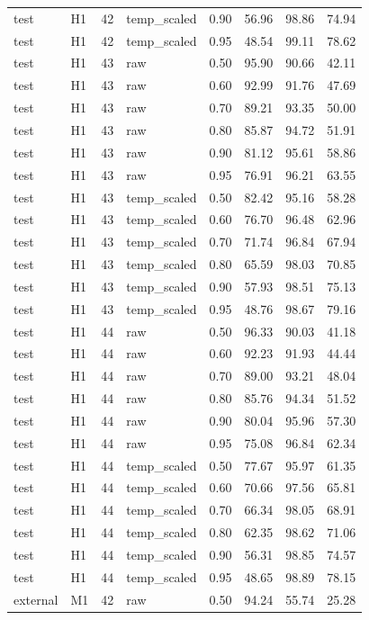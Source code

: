 \begin{tabular}{llrlrrrr}
test & H1 & 42 & temp\_scaled & 0.90 & 56.96 & 98.86 & 74.94 \\
test & H1 & 42 & temp\_scaled & 0.95 & 48.54 & 99.11 & 78.62 \\
test & H1 & 43 & raw & 0.50 & 95.90 & 90.66 & 42.11 \\
test & H1 & 43 & raw & 0.60 & 92.99 & 91.76 & 47.69 \\
test & H1 & 43 & raw & 0.70 & 89.21 & 93.35 & 50.00 \\
test & H1 & 43 & raw & 0.80 & 85.87 & 94.72 & 51.91 \\
test & H1 & 43 & raw & 0.90 & 81.12 & 95.61 & 58.86 \\
test & H1 & 43 & raw & 0.95 & 76.91 & 96.21 & 63.55 \\
test & H1 & 43 & temp\_scaled & 0.50 & 82.42 & 95.16 & 58.28 \\
test & H1 & 43 & temp\_scaled & 0.60 & 76.70 & 96.48 & 62.96 \\
test & H1 & 43 & temp\_scaled & 0.70 & 71.74 & 96.84 & 67.94 \\
test & H1 & 43 & temp\_scaled & 0.80 & 65.59 & 98.03 & 70.85 \\
test & H1 & 43 & temp\_scaled & 0.90 & 57.93 & 98.51 & 75.13 \\
test & H1 & 43 & temp\_scaled & 0.95 & 48.76 & 98.67 & 79.16 \\
test & H1 & 44 & raw & 0.50 & 96.33 & 90.03 & 41.18 \\
test & H1 & 44 & raw & 0.60 & 92.23 & 91.93 & 44.44 \\
test & H1 & 44 & raw & 0.70 & 89.00 & 93.21 & 48.04 \\
test & H1 & 44 & raw & 0.80 & 85.76 & 94.34 & 51.52 \\
test & H1 & 44 & raw & 0.90 & 80.04 & 95.96 & 57.30 \\
test & H1 & 44 & raw & 0.95 & 75.08 & 96.84 & 62.34 \\
test & H1 & 44 & temp\_scaled & 0.50 & 77.67 & 95.97 & 61.35 \\
test & H1 & 44 & temp\_scaled & 0.60 & 70.66 & 97.56 & 65.81 \\
test & H1 & 44 & temp\_scaled & 0.70 & 66.34 & 98.05 & 68.91 \\
test & H1 & 44 & temp\_scaled & 0.80 & 62.35 & 98.62 & 71.06 \\
test & H1 & 44 & temp\_scaled & 0.90 & 56.31 & 98.85 & 74.57 \\
test & H1 & 44 & temp\_scaled & 0.95 & 48.65 & 98.89 & 78.15 \\
external & M1 & 42 & raw & 0.50 & 94.24 & 55.74 & 25.28 \\

\end{tabular}
